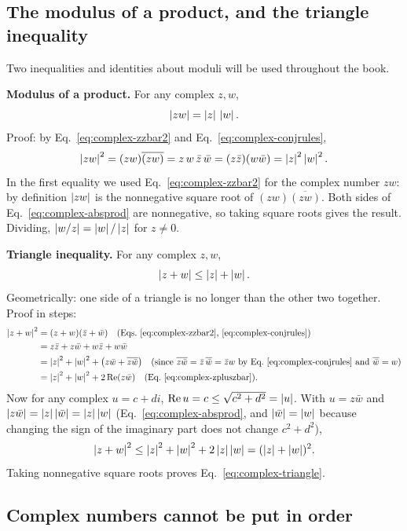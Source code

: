 \subsection{The modulus of a product, and the triangle inequality}

Two inequalities and identities about moduli will be used throughout the book.

\textbf{Modulus of a product.} For any complex $z,w$,
\begin{equation}
\left\lvert zw\right\rvert=\left\lvert z\right\rvert\,\left\lvert w\right\rvert.\label{eq:complex-absprod}
\end{equation}
Proof: by Eq.~\eqref{eq:complex-zzbar2} and Eq.~\eqref{eq:complex-conjrules},
\[
\left\lvert zw\right\rvert^2=(zw)\overline{(zw)}=z\,w\,\bar z\,\bar w=(z\bar z)(w\bar w)=\left\lvert z\right\rvert^2\left\lvert w\right\rvert^2 .
\]
In the first equality we used Eq.~\eqref{eq:complex-zzbar2} for the complex number $zw$: by definition $\left\lvert zw\right\rvert$ is the nonnegative square root of $(zw)\overline{(zw)}$. Both sides of Eq.~\eqref{eq:complex-absprod} are nonnegative, so taking square roots gives the result. Dividing, $\left\lvert w/z\right\rvert=\left\lvert w\right\rvert/\left\lvert z\right\rvert$ for $z\ne0$.

\textbf{Triangle inequality.} For any complex $z,w$,
\begin{equation}
\left\lvert z+w\right\rvert\le\left\lvert z\right\rvert+\left\lvert w\right\rvert.\label{eq:complex-triangle}
\end{equation}
Geometrically: one side of a triangle is no longer than the other two together. Proof in steps:
\begin{align*}
\left\lvert z+w\right\rvert^2&=(z+w)(\bar z+\bar w)\quad\text{(Eqs.~\eqref{eq:complex-zzbar2}, \eqref{eq:complex-conjrules})}\\
&=z\bar z+z\bar w+w\bar z+w\bar w\\
&=\left\lvert z\right\rvert^2+\left\lvert w\right\rvert^2+\bigl(z\bar w+\overline{z\bar w}\bigr)\quad\text{(since $\overline{z\bar w}=\bar z\,\overline{\bar w}=\bar z w$ by Eq.~\eqref{eq:complex-conjrules} and $\overline{\bar w}=w$)}\\
&=\left\lvert z\right\rvert^2+\left\lvert w\right\rvert^2+2\operatorname{Re}(z\bar w)\quad\text{(Eq.~\eqref{eq:complex-zpluszbar})}.
\end{align*}
Now for any complex $u=c+di$, $\operatorname{Re} u=c\le\sqrt{c^2+d^2}=\left\lvert u\right\rvert$. With $u=z\bar w$ and $\left\lvert z\bar w\right\rvert=\left\lvert z\right\rvert\left\lvert \bar w\right\rvert=\left\lvert z\right\rvert\left\lvert w\right\rvert$ (Eq.~\eqref{eq:complex-absprod}, and $\left\lvert \bar w\right\rvert=\left\lvert w\right\rvert$ because changing the sign of the imaginary part does not change $c^2+d^2$),
\[
\left\lvert z+w\right\rvert^2\le\left\lvert z\right\rvert^2+\left\lvert w\right\rvert^2+2\left\lvert z\right\rvert\left\lvert w\right\rvert=(\left\lvert z\right\rvert+\left\lvert w\right\rvert)^2 .
\]
Taking nonnegative square roots proves Eq.~\eqref{eq:complex-triangle}.

\subsection{Complex numbers cannot be put in order}

